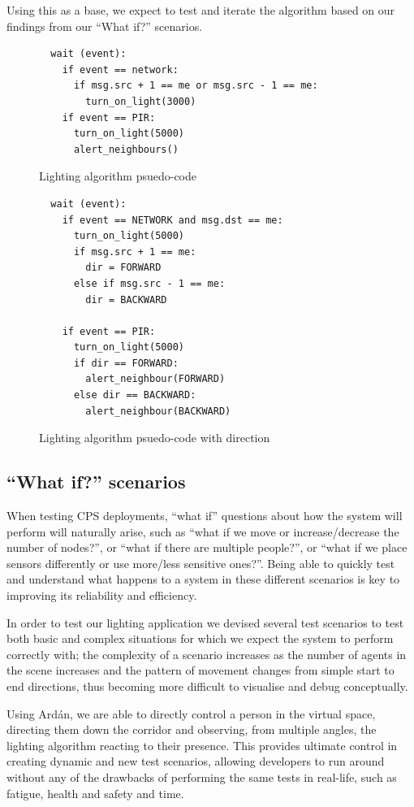 Using this as a base, we expect to test and iterate the algorithm based on our findings from our ``What if?'' scenarios.
\begin{figure}
\begin{verbatim}
  wait (event):
    if event == network:
      if msg.src + 1 == me or msg.src - 1 == me:
        turn_on_light(3000)
    if event == PIR:
      turn_on_light(5000)
      alert_neighbours()
\end{verbatim}
\caption{Lighting algorithm psuedo-code}
\label{fig:algorithm}
\end{figure}
\begin{figure}
\begin{verbatim}
  wait (event):
    if event == NETWORK and msg.dst == me:
      turn_on_light(5000)
      if msg.src + 1 == me:
        dir = FORWARD
      else if msg.src - 1 == me:
        dir = BACKWARD

    if event == PIR:
      turn_on_light(5000)
      if dir == FORWARD:
        alert_neighbour(FORWARD)
      else dir == BACKWARD:
        alert_neighbour(BACKWARD)
\end{verbatim}
\caption{Lighting algorithm psuedo-code with direction}
\label{fig:algorithm2}
\end{figure}



\subsection{``What if?'' scenarios}
\label{sub:Creating test scenarios}
When testing CPS deployments, ``what if'' questions about how the system will perform will naturally arise, such as ``what if we move or increase/decrease the number of nodes?'', or ``what if there are multiple people?'', or ``what if we place sensors differently or use more/less sensitive ones?''. Being able to quickly test and understand what happens to a system in these different scenarios is key to improving its reliability and efficiency.

In order to test our lighting application we devised several test scenarios to test both basic and complex situations for which we expect the system to perform correctly with; the complexity of a scenario increases as the number of agents in the scene increases and the pattern of movement changes from simple start to end directions, thus becoming more difficult to visualise and debug conceptually.

Using Ard\'{a}n, we are able to directly control a person in the virtual space, directing them down the corridor and observing, from multiple angles, the lighting algorithm reacting to their presence. This provides ultimate control in creating dynamic and new test scenarios, allowing developers to run around without any of the drawbacks of performing the same tests in real-life, such as fatigue, health and safety and time.

